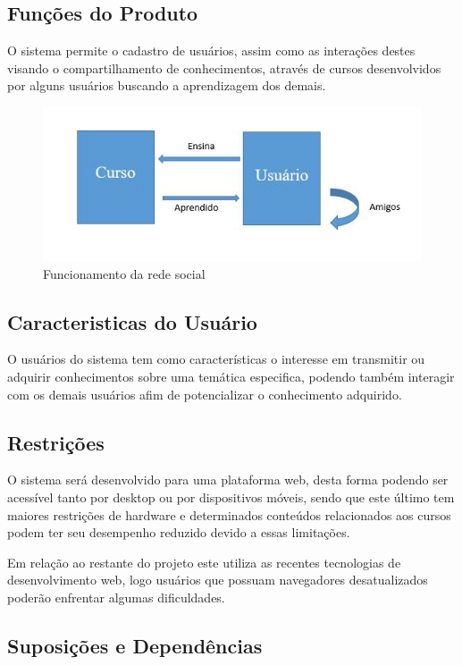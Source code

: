 \documentclass[12pt,a4paper,onecolumn,titlepage]{article}
\begin{document}
\subsection{Funções do Produto}


O sistema permite o cadastro de usuários, assim como as interações destes visando o compartilhamento de conhecimentos, através de cursos desenvolvidos por alguns usuários buscando a aprendizagem dos demais.

\begin{figure}[!htb]
  \centering
  \includegraphics[scale=0.7]{figura1.png}
  \caption{Funcionamento da rede social}
  \label{figRotulo}
\end{figure}


\subsection{Caracteristicas do Usuário}

O usuários do sistema tem como características o interesse em transmitir ou adquirir conhecimentos sobre uma temática especifica, podendo também interagir com os demais usuários afim de potencializar o conhecimento adquirido.

\subsection{Restrições}

O sistema será desenvolvido para uma plataforma web, desta forma podendo ser acessível tanto por desktop ou por dispositivos móveis, sendo que este último tem maiores restrições de hardware e determinados conteúdos relacionados aos cursos podem ter seu desempenho reduzido devido a essas limitações.

Em relação ao restante do projeto este utiliza as recentes tecnologias de desenvolvimento web, logo usuários que possuam navegadores desatualizados poderão enfrentar algumas dificuldades.

\subsection{Suposições e Dependências}
\end{document}
